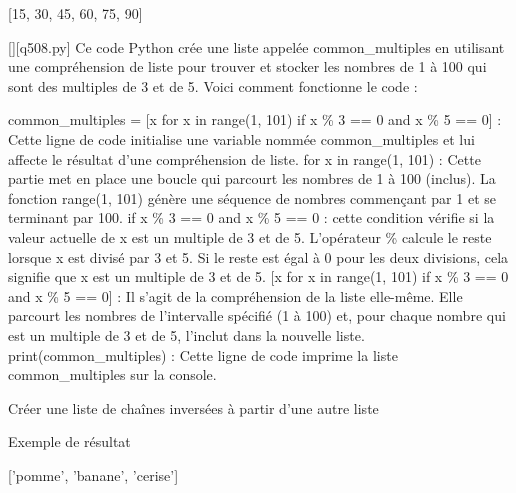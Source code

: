 [15, 30, 45, 60, 75, 90]
        \par
        \begin{solution}
            \renewcommand{\nomfichier}{q508.py}
            \pythonfile{\chemincode \nomfichier}[][\nomfichier]
            Ce code Python crée une liste appelée common\_multiples en utilisant une compréhension de liste pour trouver et stocker les nombres de 1 à 100 qui sont des multiples de 3 et de 5. Voici comment fonctionne le code :

    common\_multiples = [x for x in range(1, 101) if x \% 3 == 0 and x \% 5 == 0] : Cette ligne de code initialise une variable nommée common\_multiples et lui affecte le résultat d'une compréhension de liste.
        for x in range(1, 101) : Cette partie met en place une boucle qui parcourt les nombres de 1 à 100 (inclus). La fonction range(1, 101) génère une séquence de nombres commençant par 1 et se terminant par 100.
        if x \% 3 == 0 and x \% 5 == 0 : cette condition vérifie si la valeur actuelle de x est un multiple de 3 et de 5. L'opérateur \% calcule le reste lorsque x est divisé par 3 et 5. Si le reste est égal à 0 pour les deux divisions, cela signifie que x est un multiple de 3 et de 5.
        [x for x in range(1, 101) if x \% 3 == 0 and x \% 5 == 0] : Il s'agit de la compréhension de la liste elle-même. Elle parcourt les nombres de l'intervalle spécifié (1 à 100) et, pour chaque nombre qui est un multiple de 3 et de 5, l'inclut dans la nouvelle liste.
    print(common\_multiples) : Cette ligne de code imprime la liste common\_multiples sur la console.
        \end{solution}
        

        \question
        Créer une liste de chaînes inversées à partir d'une autre liste

Exemple de résultat

['pomme', 'banane', 'cerise']

